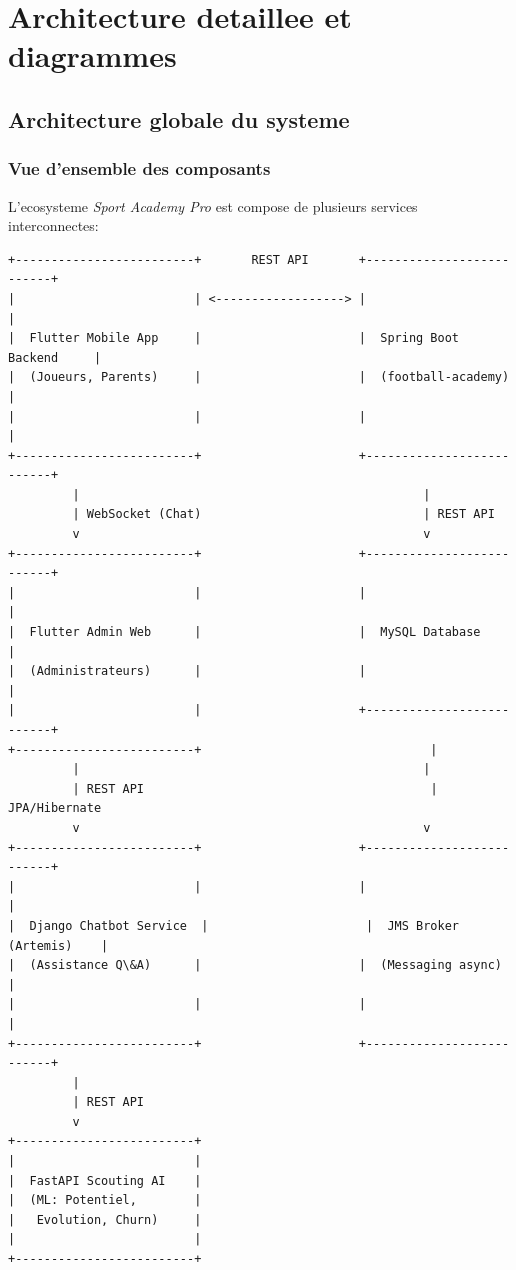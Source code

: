 \chapter{Architecture detaillee et diagrammes}

\section{Architecture globale du systeme}

\subsection*{Vue d'ensemble des composants}

L'ecosysteme \textit{Sport Academy Pro} est compose de plusieurs services interconnectes:

\begin{lstlisting}[style=codeblock]
+-------------------------+       REST API       +--------------------------+
|                         | <------------------> |                          |
|  Flutter Mobile App     |                      |  Spring Boot Backend     |
|  (Joueurs, Parents)     |                      |  (football-academy)      |
|                         |                      |                          |
+-------------------------+                      +--------------------------+
         |                                                |
         | WebSocket (Chat)                               | REST API
         v                                                v
+-------------------------+                      +--------------------------+
|                         |                      |                          |
|  Flutter Admin Web      |                      |  MySQL Database          |
|  (Administrateurs)      |                      |                          |
|                         |                      +--------------------------+
+-------------------------+                                |
         |                                                |
         | REST API                                        | JPA/Hibernate
         v                                                v
+-------------------------+                      +--------------------------+
|                         |                      |                          |
|  Django Chatbot Service  |                      |  JMS Broker (Artemis)    |
|  (Assistance Q\&A)      |                      |  (Messaging async)       |
|                         |                      |                          |
+-------------------------+                      +--------------------------+
         |
         | REST API
         v
+-------------------------+
|                         |
|  FastAPI Scouting AI    |
|  (ML: Potentiel,        |
|   Evolution, Churn)     |
|                         |
+-------------------------+
\end{lstlisting}

